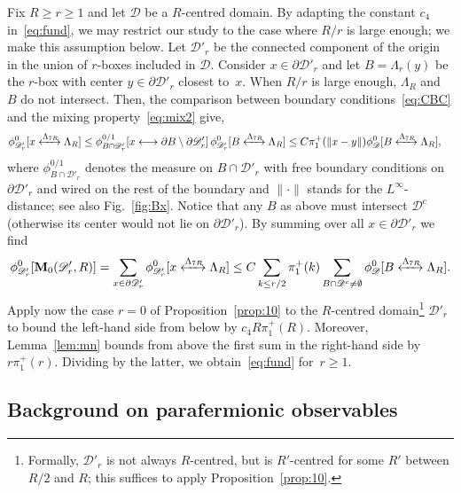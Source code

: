 \documentclass[a4paper,oneside,11pt]{article}
\numberwithin{equation}{section}
\numberwithin{equation}{section}
\numberwithin{equation}{section}
\newcommand{\calD}{\mathcal{D}}
\newcommand{\La}{\Lambda}
\begin{document}
Fix $R \geq r\ge1$ and let $\calD$ be a $R$-centred domain. 
By adapting the constant $c_4$ in~\eqref{eq:fund}, we may restrict our study to the case where $R/r$ is large enough; we make this assumption below.  
Let $\calD'_r$ be the connected component of the origin in the union of $r$-boxes included in $\calD$. 
Consider $x\in \partial\calD'_r$ and let $B = \La_r(y)$ be the $r$-box with center $y \in \partial\calD'_r$ closest to~$x$. 
When $R/r$ is large enough, $\La_R$ and $B$ do not intersect. 
Then, the comparison between boundary conditions~\eqref{eq:CBC} and the mixing property~\eqref{eq:mix2} give,
\begin{align*}
	\phi_{\calD'_r}^0[x\xleftrightarrow{\Lambda_{7R}}  \Lambda_R]
	&\le \phi_{B\cap\calD'_r}^{0/1}[x\longleftrightarrow \partial B\setminus \partial \calD'_r]\,\phi_{\calD'_r}^0[B\xleftrightarrow{\Lambda_{7R}}  \Lambda_R]\le C\pi_1^+(\|x - y\|)\phi_{\calD}^0[B\xleftrightarrow{\Lambda_{7R}}  \Lambda_R],
\end{align*}
where $\phi_{B\cap\calD'_r}^{0/1}$ denotes the measure on $B\cap\calD'_r$ with free boundary conditions on $\partial \calD'_r$ and wired on the rest of the boundary and $\|\cdot\|$ stands for the $L^\infty$-distance; see also Fig.~\ref{fig:Bx}.
Notice that any $B$ as above must intersect $\calD^c$ (otherwise its center would not lie on $\partial\calD'_r$).
By summing over all $x\in \partial\calD'_r$ we find
\begin{equation}\label{eq:hh4}
    \phi_{\calD_r'}^0[\mathbf M_0(\calD_r',R)] 
    = \sum_{x\in \partial\calD'_r}\phi_{\calD'_r}^0[x\xleftrightarrow{\Lambda_{7R}}  \Lambda_R]
    \leq C\sum_{k\le r/2}\pi_1^+(k) \sum_{B\cap \calD^c\ne\emptyset}\phi_{\calD}^0[B\xleftrightarrow{\Lambda_{7R}}  \Lambda_R].
\end{equation}
Apply now the case $r=0$ of Proposition~\ref{prop:10}  to the $R$-centred domain\footnote{Formally, $\calD'_r$ is not always $R$-centred, but is $R'$-centred for some $R'$ between $R/2$ and $R$; this suffices to apply Proposition~\ref{prop:10}.} $\calD'_r$ to bound the left-hand side from below by $c_4R\pi_1^+(R)$. 
Moreover, Lemma~\ref{lem:mn} bounds from above the first sum in the right-hand side by $r\pi_1^+(r)$. 
Dividing by the latter, we obtain~\eqref{eq:fund} for~$r \geq 1$. 

\subsection{Background on parafermionic observables}\label{sec:3.1}
\end{document}
